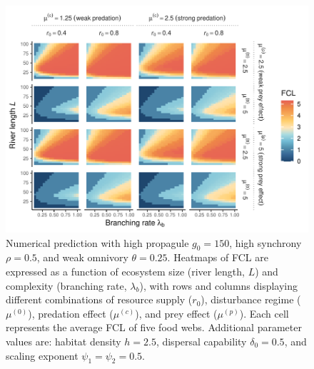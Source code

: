 \begin{figure}
\centering
\includegraphics{../data_fmt/fig_rho05_g150_theta025.pdf}
\caption{Numerical prediction with high propagule \(g_0 = 150\), high
synchrony \(\rho = 0.5\), and weak omnivory \(\theta = 0.25\). Heatmaps
of FCL are expressed as a function of ecosystem size (river length,
\(L\)) and complexity (branching rate, \(\lambda_b\)), with rows and
columns displaying different combinations of resource supply (\(r_0\)),
disturbance regime (\(\mu^{(0)}\)), predation effect (\(\mu^{(c)}\)),
and prey effect (\(\mu^{(p)}\)). Each cell represents the average FCL of
five food webs. Additional parameter values are: habitat density
\(h=2.5\), dispersal capability \(\delta_0=0.5\), and scaling exponent
\(\psi_1=\psi_2=0.5\).\label{fig:fig-num4}}
\end{figure}

\newpage

